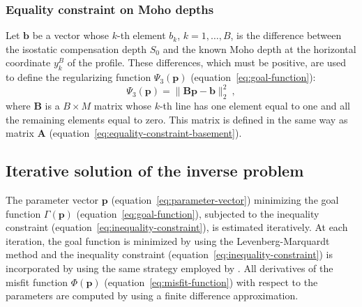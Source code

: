 \documentclass[manuscript]{geophysics}
\begin{document}
\subsubsection*{Equality constraint on Moho depths}

Let $\mathbf{b}$ be a vector whose $k$-th element $b_{k}$,
$k = 1, \dots, B$, is the difference between the isostatic compensation depth
$S_{0}$ and the known Moho depth at the horizontal coordinate $y^{B}_{k}$ of the
profile. These differences, which must be positive, are used to define the 
regularizing function $\Psi_{3}(\mathbf{p})$ (equation~\ref{eq:goal-function}):
\begin{equation}
\Psi_{3}(\mathbf{p}) = \| \mathbf{B}\mathbf{p} - \mathbf{b} \|_{2}^{2} \: ,
\label{eq:equality-constraint-moho}
\end{equation}
where $\mathbf{B}$ is a $B \times M$ matrix whose $k$-th line has one element 
equal to one and all the remaining elements equal to zero. This matrix is defined 
in the same way as matrix $\mathbf{A}$ (equation~\ref{eq:equality-constraint-basement}).


\subsection{Iterative solution of the inverse problem}

The parameter vector $\mathbf{p}$ (equation~\ref{eq:parameter-vector}) minimizing the
goal function $\Gamma (\mathbf{p})$ (equation~\ref{eq:goal-function}), subjected to
the inequality constraint (equation~\ref{eq:inequality-constraint}), is estimated 
iteratively. 
At each iteration, the goal function is minimized by using the Levenberg-Marquardt 
method \citep{aster-etal2005} and the inequality constraint 
(equation~\ref{eq:inequality-constraint}) is incorporated by using the same strategy 
employed by \citet{barbosa-etal1999}.
All derivatives of the misfit function $\Phi(\mathbf{p})$ (equation~\ref{eq:misfit-function})
with respect to the parameters are computed by using a finite difference approximation.
\end{document}
